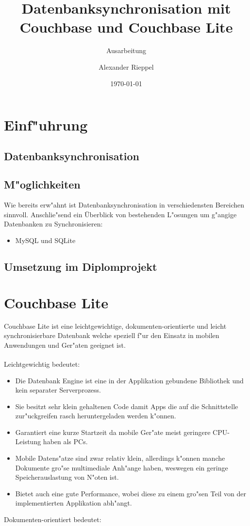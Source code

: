 \documentclass[a4paper,12pt]{scrreprt}
\begin{document}
\author{Alexander Rieppel} %
\title{Datenbanksynchronisation mit Couchbase und Couchbase Lite} %
\subject{VSDB} %
\subtitle{Ausarbeitung} %
\date{\today} %
\publishers{5AHITT} %

\maketitle
\tableofcontents
 

\chapter{Einf"uhrung}
\section{Datenbanksynchronisation}
\section{M"oglichkeiten}
Wie bereits erw"ahnt ist Datenbanksynchronisation in verschiedensten Bereichen sinnvoll. Anschlie"send ein Überblick von bestehenden L"osungen um g"angige Datenbanken zu Synchronisieren:
\begin{itemize}
\item MySQL und SQLite
\end{itemize}
\section{Umsetzung im Diplomprojekt}

\chapter{Couchbase Lite}
Couchbase Lite ist eine leichtgewichtige, dokumenten-orientierte und leicht synchronisierbare Datenbank welche speziell f"ur den Einsatz in mobilen Anwendungen und Ger"aten geeignet ist.\\\\  Leichtgewichtig bedeutet:

\begin{itemize}
\item Die Datenbank Engine ist eine in der Applikation gebundene Bibliothek und kein separater Serverprozess.
\item Sie besitzt sehr klein gehaltenen Code damit Apps die auf die Schnittstelle zur"uckgreifen rasch heruntergeladen werden k"onnen.
\item Garantiert eine kurze Startzeit da mobile Ger"ate meist geringere CPU-Leistung haben als PCs.
\item Mobile Datens"atze sind zwar relativ klein, allerdings k"onnen manche Dokumente gro"se multimediale Anh"ange haben, weswegen ein geringe Speicherauslastung von N"oten ist.
\item Bietet auch eine gute Performance, wobei diese zu einem gro"sen Teil von der implementierten Applikation abh"angt.
\end{itemize}
Dokumenten-orientiert bedeutet:
\end{document}
